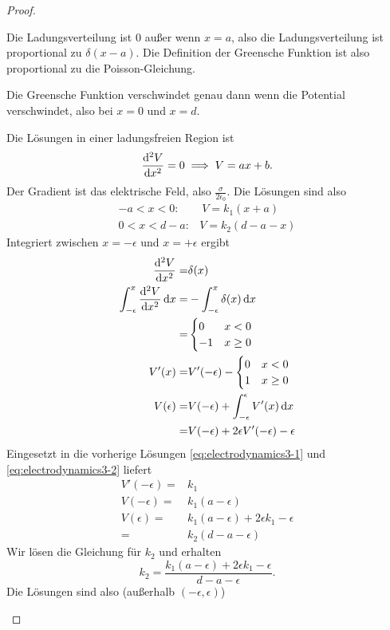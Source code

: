 \begin{proof}
	\begin{parts}
	\item Die Ladungsverteilung ist 0 außer wenn $x=a$, also die Ladungsverteilung ist proportional zu $\delta(x-a)$. Die Definition der Greensche Funktion ist also proportional zu die Poisson-Gleichung.
	
		Die Greensche Funktion verschwindet genau dann wenn die Potential verschwindet, also bei $x=0$ und $x=d$.
	\item Die Lösungen in einer ladungsfreien Region ist
		\[
		\dv[2]{V}{x}=0\implies V = a x + b
		.\] 
		Der Gradient ist das elektrische Feld, also $\frac{\sigma}{2\epsilon_0}$. Die Lösungen sind also
		\begin{align}
			-a<x<0:&~V = k_1(x+a)\label{eq:electrodynamics3-1}\\
			0<x<d-a:&V= k_2(d-a-x)\label{eq:electrodynamics3-2}
		\end{align}
		Integriert zwischen $x=-\epsilon$ und $x=+\epsilon$ ergibt
\begin{align*}
	\dv[2]{V}{x}=& \delta(x)\\
	\int_{-\epsilon}^x \dv[2]{V}{x}\dd{x}=& -\int_{-\epsilon}^{x} \delta(x)\dd{x}\\
	=& \begin{cases}
		0 & x < 0\\ 
		-1 & x \ge 0
	\end{cases}\\
		V'(x)=&V'(-\epsilon) - \begin{cases}
		0 & x < 0\\
		1 & x \ge 0
	\end{cases}\\
			V(\epsilon) =& V(-\epsilon) + \int_{-\epsilon}^\epsilon V'(x)\dd{x}\\
			=& V(-\epsilon) + 2\epsilon V'(-\epsilon) - \epsilon
\end{align*}
Eingesetzt in die vorherige Lösungen \eqref{eq:electrodynamics3-1} und \eqref{eq:electrodynamics3-2} liefert
\begin{align*}
	V'(-\epsilon) =& k_1\\
	V(-\epsilon) =& k_1 (a-\epsilon)\\
	V(\epsilon) =& k_1(a-\epsilon)+2\epsilon k_1 - \epsilon\\
	=&k_2(d-a-\epsilon) 
\end{align*}
Wir lösen die Gleichung für $k_2$ und erhalten
\[
k_2= \frac{k_1(a-\epsilon) + 2\epsilon k_1-\epsilon}{d-a-\epsilon}
.\] 
Die Lösungen sind also (außerhalb $(-\epsilon,\epsilon)$)

\end{parts}
\end{proof}
